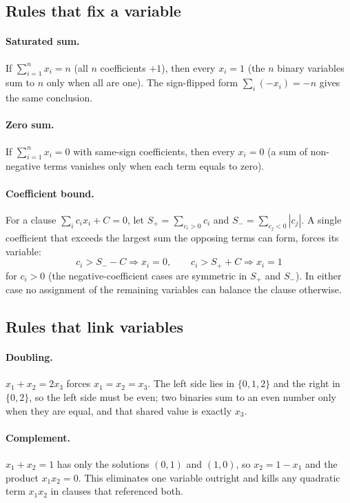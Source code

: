\documentclass[reprint,twocolumn,amsmath,amssymb,nofootinbib]{revtex4-2}
\begin{document}
\subsection{Rules that fix a variable}

\paragraph{Saturated sum.} If $\sum_{i=1}^n x_i = n$ (all $n$ coefficients $+1$), then every $x_i = 1$ (the $n$ binary variables sum to $n$ only when all are one). The sign-flipped form $\sum_i (-x_i) = -n$ gives the same conclusion.

\paragraph{Zero sum.} If $\sum_{i=1}^n x_i = 0$ with same-sign coefficients, then every $x_i = 0$ (a sum of non-negative terms vanishes only when each term equals to zero).

\paragraph{Coefficient bound.} For a clause $\sum_i c_i x_i + C = 0$, let $S_+ = \sum_{c_i > 0} c_i$ and $S_- = \sum_{c_j < 0} |c_j|$. A single coefficient that exceeds the largest sum the opposing terms can form, forces its variable:
\begin{equation*}
  c_i > S_- - C \Rightarrow x_i = 0,
  \qquad
  c_i > S_+ + C \Rightarrow x_i = 1
\end{equation*}
for $c_i > 0$ (the negative-coefficient cases are symmetric in $S_+$ and $S_-$). In either case no assignment of the remaining variables can balance the clause otherwise.

\subsection{Rules that link variables}

\paragraph{Doubling.} $x_1 + x_2 = 2 x_3$ forces $x_1 = x_2 = x_3$. The left side lies in $\{0,1,2\}$ and the right in $\{0,2\}$, so the left side must be even; two binaries sum to an even number only when they are equal, and that shared value is exactly $x_3$.

\paragraph{Complement.} $x_1 + x_2 = 1$ has only the solutions $(0,1)$ and $(1,0)$, so $x_2 = 1 - x_1$ and the product $x_1 x_2 = 0$. This eliminates one variable outright and kills any quadratic term $x_1 x_2$ in clauses that referenced both.
\end{document}
